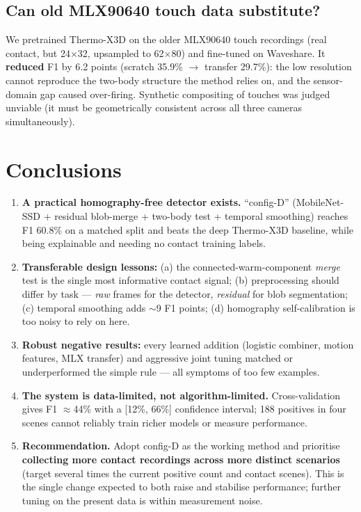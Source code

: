 \documentclass[11pt, a4paper]{article}
\begin{document}
\subsection{Can old MLX90640 touch data substitute?}
We pretrained Thermo-X3D on the older MLX90640 touch recordings (real contact, but
24$\times$32, upsampled to 62$\times$80) and fine-tuned on Waveshare. It
\textbf{reduced} F1 by 6.2 points (scratch 35.9\% $\to$ transfer 29.7\%): the low
resolution cannot reproduce the two-body structure the method relies on, and the
sensor-domain gap caused over-firing. Synthetic compositing of touches was judged
unviable (it must be geometrically consistent across all three cameras
simultaneously).

\section{Conclusions}
\begin{enumerate}[leftmargin=1.6em, itemsep=2pt]
\item \textbf{A practical homography-free detector exists.} ``config-D''
      (MobileNet-SSD + residual blob-merge + two-body test + temporal smoothing)
      reaches F1 60.8\% on a matched split and beats the deep Thermo-X3D baseline,
      while being explainable and needing no contact training labels.
\item \textbf{Transferable design lessons:} (a) the connected-warm-component
      \emph{merge} test is the single most informative contact signal; (b)
      preprocessing should differ by task --- \emph{raw} frames for the detector,
      \emph{residual} for blob segmentation; (c) temporal smoothing adds $\sim$9
      F1 points; (d) homography self-calibration is too noisy to rely on here.
\item \textbf{Robust negative results:} every learned addition (logistic
      combiner, motion features, MLX transfer) and aggressive joint tuning matched
      or underperformed the simple rule --- all symptoms of too few examples.
\item \textbf{The system is data-limited, not algorithm-limited.} Cross-validation
      gives F1 $\approx$44\% with a [12\%, 66\%] confidence interval; 188 positives
      in four scenes cannot reliably train richer models or measure performance.
\item \textbf{Recommendation.} Adopt config-D as the working method and prioritise
      \textbf{collecting more contact recordings across more distinct scenarios}
      (target several times the current positive count and contact scenes). This is
      the single change expected to both raise and stabilise performance; further
      tuning on the present data is within measurement noise.
\end{enumerate}
\end{document}
